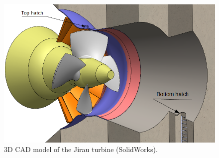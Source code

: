 \begin{figure}[h!]
\centering
	\includegraphics[width=\columnwidth]{figs/estudo/solid/ambiente_3d} 
	\caption{3D CAD model of the Jirau turbine
	(SolidWorks\raisebox{1ex}{\textregistered}).}
	\label{fig::ambiente3d}
\end{figure}




